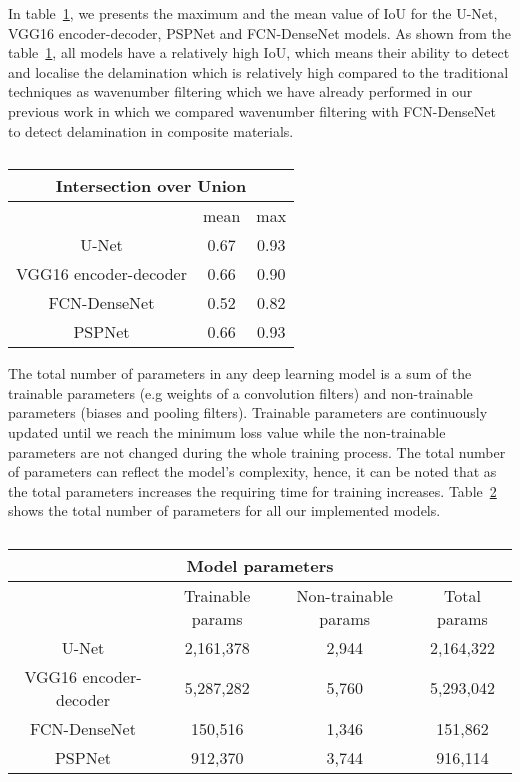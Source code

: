 In table~\ref{tab:table_iou}, we presents the maximum and the mean value of IoU for the U-Net, VGG16 encoder-decoder, PSPNet and FCN-DenseNet models.
As shown from the table~\ref{tab:table_iou}, all models have a relatively high IoU, which means their ability to detect and localise the delamination which is relatively high compared to the traditional techniques as wavenumber filtering which we have already performed in our previous work in which we compared wavenumber filtering with FCN-DenseNet to detect delamination in composite materials.
\begin{table}[]
	\centering
	\caption{}
	\label{tab:table_iou}
	\begin{tabular}{ccc}
		\multicolumn{3}{c}{Intersection over Union} \\ \hline
		& mean & max \\ \hline
		U-Net & 0.67 & 0.93 \\ \hline
		VGG16 encoder-decoder & 0.66 & 0.90 \\ \hline
		FCN-DenseNet & 0.52 & 0.82 \\ \hline
		PSPNet & 0.66 & 0.93 \\ \hline
	\end{tabular}
\end{table}

The total number of parameters in any deep learning model is a sum of the trainable parameters (e.g weights of a convolution filters) and non-trainable parameters (biases and  pooling filters).
Trainable parameters are continuously updated until we reach the minimum loss value while the non-trainable parameters are not changed during the whole training process.
The total number of parameters can reflect the model's complexity, hence, it can be noted that as the total parameters increases the requiring time for training increases.
Table~\ref{tab:table_parameters} shows the total number of parameters for all our implemented models.
\begin{table}[]
	\centering
	\caption{}
	\label{tab:table_parameters}
	\resizebox{\textwidth}{!}
	{
		\begin{tabular}{cccc}
			\multicolumn{4}{c}{Model parameters} \\ \hline
			& Trainable params & Non-trainable params & Total params \\ \hline
			U-Net & 2,161,378 & 2,944 & 2,164,322 \\ \hline
			VGG16 encoder-decoder & 5,287,282 & 5,760 & 5,293,042 \\ \hline
			FCN-DenseNet & 150,516 & 1,346 & 151,862 \\ \hline
			PSPNet & 912,370 & 3,744 & 916,114 \\ \hline
		\end{tabular}
	}
\end{table}
